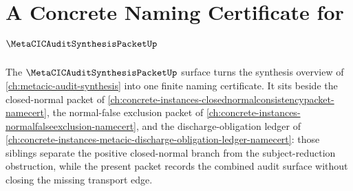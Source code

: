 \chapter{A Concrete Naming Certificate for $\MetaCICAuditSynthesisPacketUp$}
\label{ch:concrete-instances-metacicauditsynthesispacket-namecert}

The $\MetaCICAuditSynthesisPacketUp$ surface turns the synthesis overview of \autoref{ch:metacic-audit-synthesis} into one finite naming certificate. It sits beside the closed-normal packet of \autoref{ch:concrete-instances-closednormalconsistencypacket-namecert}, the normal-false exclusion packet of \autoref{ch:concrete-instances-normalfalseexclusion-namecert}, and the discharge-obligation ledger of \autoref{ch:concrete-instances-metacic-discharge-obligation-ledger-namecert}: those siblings separate the positive closed-normal branch from the subject-reduction obstruction, while the present packet records the combined audit surface without closing the missing transport edge.

